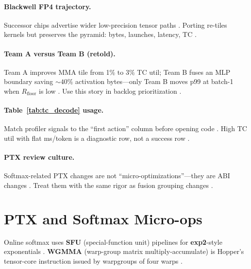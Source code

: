 \paragraph{Blackwell FP4 trajectory.}
Successor chips advertise wider low-precision tensor paths \citep{liu2024deepseekv3,nvidia2022hopper,patel2025llminference}.
Porting re-tiles kernels but preserves the pyramid: bytes, launches, latency, TC \citep{memoryfloor2026,taxbreak2026,yirage2026,semianalysis2024tma}.

\paragraph{Team A versus Team B (retold).}
Team A improves MMA tile from 1\% to 3\% TC util; Team B fuses an MLP boundary saving ${\sim}40\%$ activation bytes---only Team B moves p99 at batch-1 when $R_{\mathrm{floor}}$ is low \citep{memoryfloor2026,taxbreak2026,patel2025llminference,dao2022flashattention}.
Use this story in backlog prioritization \citep{yirage2026,taxbreak2026}.

\paragraph{Table~\ref{tab:tc_decode} usage.}
Match profiler signals to the ``first action'' column before opening code \citep{patel2025llminference,memoryfloor2026,taxbreak2026}.
High TC util with flat ms/token is a diagnostic row, not a success row \citep{memoryfloor2026,dao2022flashattention}.

\paragraph{PTX review culture.}
Softmax-related PTX changes are not ``micro-optimizations''---they are ABI changes \citep{dao2022flashattention,liu2024deepseekv3,yirage2026,patel2025llminference}.
Treat them with the same rigor as fusion grouping changes \citep{chen2020compilerbasedhardw,dao2023flashdecoding}.

\section{PTX and Softmax Micro-ops}
\label{sec:ch04_ptx}

Online softmax uses \textbf{SFU} (special-function unit) pipelines for \textbf{exp2}-style exponentials \citep{dao2022flashattention,nvidia2022hopper}.
\textbf{WGMMA} (warp-group matrix multiply-accumulate) is Hopper's tensor-core instruction issued by warpgroups of four warps \citep{shah2024flashattention3}.

